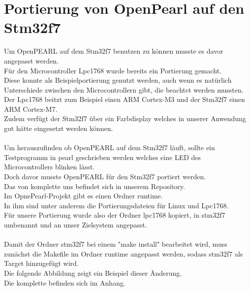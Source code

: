 \section{Portierung von OpenPearl auf den Stm32f7}
Um OpenPEARL auf dem Stm32f7 benutzen zu können musste es davor angepasst werden.\\
Für den Microcontroller Lpc1768 wurde bereits ein Portierung gemacht.\\
Diese konnte als Beispielportierung genutzt werden, auch wenn es natürlich Unterschiede zwischen den Microcontrollern gibt, die beachtet werden mussten.\\
Der Lpc1768 beitzt zum Beispiel einen ARM Cortex-M3 und der Stm32f7 einen ARM Cortex-M7.\\
Zudem verfügt der Stm32f7 über ein Farbdisplay welches in unserer Anwendung gut hätte eingesetzt werden können.\\
\\
Um herauszufinden ob OpenPEARL auf dem Stm32f7 läuft, sollte ein Testprogramm in pearl geschrieben werden welches eine LED des Microcontrollers blinken lässt.\\
Doch davor musste OpenPEARL für den Stm32f7 portiert werden.\\
Das von komplette uns  befindet sich in unserem Repository.\\
Im OpnePearl-Projekt gibt es einen Ordner runtime.\\
In ihm sind unter anderem die Portierungsdateien für Linux und Lpc1768.\\
Für unsere Portierung wurde also der Ordner lpc1768 kopiert, in stm32f7 umbenannt und an unser Zielsystem angepasst.\\
\\
Damit der Ordner stm32f7 bei einem "make install" bearbeitet wird, muss zunächst die Makefile im Ordner runtime angepasst werden, sodass stm32f7 als Target hinzugefügt wird.\\
Die folgende Abbildung zeigt ein Beispiel dieser Änderung.\\
Die komplette  befinden sich im Anhang.\\
